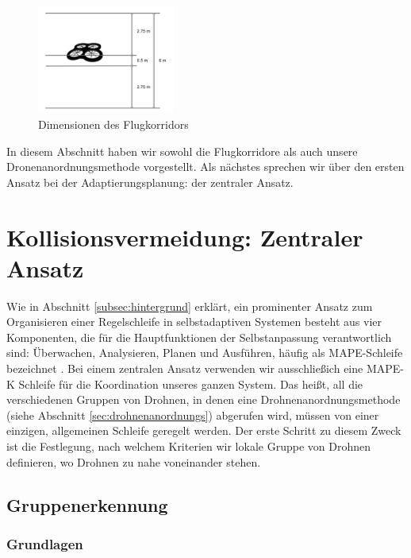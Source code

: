\documentclass[a4paper,titlepage,onecolumn,twoside,12pt]{article}
\begin{document}
\begin{figure}
\centering
\includegraphics[width = 0.4\textwidth]{Flugkorridore_Dimensionen}
\caption{Dimensionen des Flugkorridors}
\label{fig:drohnenanordnungs_beispiel}
\end{figure}

In diesem Abschnitt haben wir sowohl die Flugkorridore als auch unsere Dronenanordnungsmethode vorgestellt. Als nächstes sprechen wir über den ersten Ansatz bei der Adaptierungsplanung: der zentraler Ansatz.

\section{Kollisionsvermeidung: Zentraler Ansatz}
\label{sec:zentral}

Wie in Abschnitt \ref{subsec:hintergrund} erklärt, ein prominenter Ansatz zum Organisieren einer Regelschleife in selbstadaptiven Systemen besteht aus vier Komponenten, die für die Hauptfunktionen der Selbstanpassung verantwortlich sind: Überwachen, Analysieren, Planen und Ausführen, häufig als MAPE-Schleife bezeichnet \cite{Prager1961}. Bei einem zentralen Ansatz verwenden wir ausschließich eine MAPE-K Schleife für die Koordination unseres ganzen System. Das heißt, all die verschiedenen Gruppen von Drohnen, in denen eine Drohnenanordnungsmethode (siehe Abschnitt \ref{sec:drohnenanordnungs}) abgerufen wird, müssen von einer einzigen, allgemeinen Schleife geregelt werden. Der erste Schritt zu diesem Zweck ist die Festlegung, nach welchem Kriterien wir lokale Gruppe von Drohnen definieren, wo Drohnen zu nahe voneinander stehen.

\subsection{Gruppenerkennung}
\label{sec:gruppenerkennung}

\subsubsection{Grundlagen}
\label{subsubsec:grundlagen}
\end{document}
